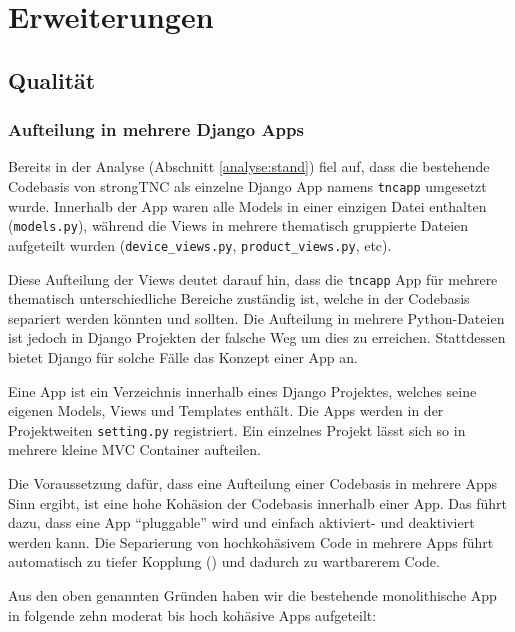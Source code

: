\section{Erweiterungen}

\subsection{Qualität}

\subsubsection{Aufteilung in mehrere Django Apps}

Bereits in der Analyse (Abschnitt \ref{analyse:stand}) fiel auf, dass
die bestehende Codebasis von strongTNC als einzelne Django App namens
\texttt{tncapp} umgesetzt wurde. Innerhalb der App waren alle Models in einer
einzigen Datei enthalten (\texttt{models.py}), während die Views in mehrere
thematisch gruppierte Dateien aufgeteilt wurden (\texttt{device\_views.py},
\texttt{product\_views.py}, etc).

Diese Aufteilung der Views deutet darauf hin, dass die \texttt{tncapp} App für
mehrere thematisch unterschiedliche Bereiche zuständig ist, welche in der
Codebasis separiert werden könnten und sollten. Die Aufteilung in mehrere
Python-Dateien ist jedoch in Django Projekten der falsche Weg um dies zu
erreichen. Stattdessen bietet Django für solche Fälle das Konzept einer App an.

Eine App ist ein Verzeichnis innerhalb eines Django Projektes, welches seine eigenen
Models, Views und Templates enthält. Die Apps werden in der
Projektweiten \texttt{setting.py} registriert. Ein einzelnes Projekt lässt sich
so in mehrere kleine MVC Container aufteilen.

Die Voraussetzung dafür, dass eine Aufteilung einer Codebasis in mehrere Apps
Sinn ergibt, ist eine hohe Kohäsion der Codebasis innerhalb einer App. Das führt
dazu, dass eine App \enquote{pluggable} wird und einfach aktiviert- und
deaktiviert werden kann. Die Separierung von hochkohäsivem Code in mehrere Apps
führt automatisch zu tiefer Kopplung (\cite[S.~232--237]{larman2002applying})
und dadurch zu wartbarerem Code.

Aus den oben genannten Gründen haben wir die bestehende monolithische App in
folgende zehn moderat bis hoch kohäsive Apps aufgeteilt:

